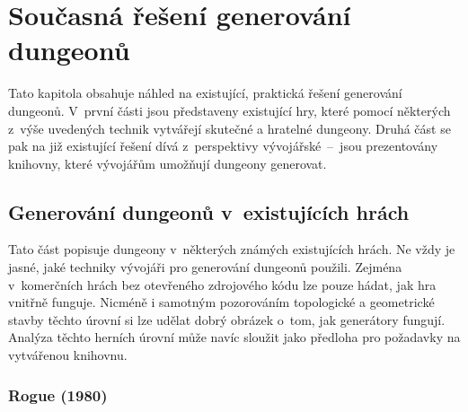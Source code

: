 
\chapter{Současná řešení generování dungeonů}
\label{ch:soucasnost} %


Tato kapitola obsahuje náhled na existující, praktická řešení generování dungeonů.
V~první části jsou představeny existující hry, které pomocí některých z~výše uvedených technik vytvářejí skutečné a hratelné dungeony.
Druhá část se pak na již existující řešení dívá z~perspektivy vývojářské~--~jsou prezentovány knihovny, které vývojářům umožňují dungeony generovat.


\section{Generování dungeonů v~existujících hrách}


Tato část popisuje dungeony v~některých známých existujících hrách.
Ne vždy je jasné, jaké techniky vývojáři pro generování dungeonů použili.
Zejména v~komerčních hrách bez otevřeného zdrojového kódu lze pouze hádat, jak hra vnitřně funguje.
Nicméně i samotným pozorováním topologické a geometrické stavby těchto úrovní si lze udělat dobrý obrázek o~tom, jak generátory fungují.
Analýza těchto herních úrovní může navíc sloužit jako předloha pro požadavky na vytvářenou knihovnu.


\subsection{Rogue (1980)}


